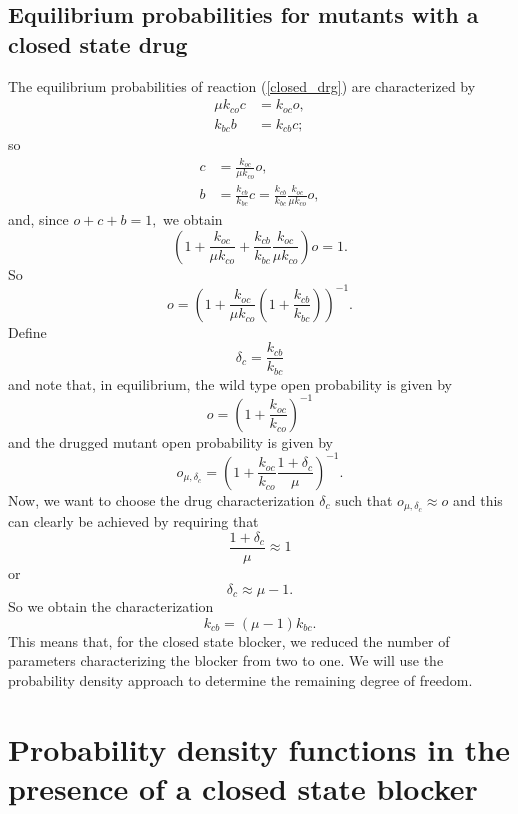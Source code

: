 \subsection{Equilibrium probabilities for mutants with a closed state drug\label{sec:eq-closed}}
The equilibrium probabilities of reaction (\ref{closed_drg}) are characterized by%
\begin{align*}
\mu k_{co}c &  =k_{oc}o,\\
k_{bc}b &  =k_{cb}c;
\end{align*}
so%
\begin{align*}
c &  =\frac{k_{oc}}{\mu k_{co}}o,\\
b &  =\frac{k_{cb}}{k_{bc}}c=\frac{k_{cb}}{k_{bc}}\frac{k_{oc}}{\mu k_{co}}o,
\end{align*}
and, since $o+c+b=1,$ we obtain%
\[
\left(  1+\frac{k_{oc}}{\mu k_{co}}+\frac{k_{cb}}{k_{bc}}\frac{k_{oc}}{\mu
k_{co}}\right)  o=1.
\]
So%
\[
o=\left(  1+\frac{k_{oc}}{\mu k_{co}}\left(  1+\frac{k_{cb}}{k_{bc}}\right)
\right)  ^{-1}.
\]
Define%
\begin{equation}
\delta_{c}=\frac{k_{cb}}{k_{bc}} \label{d_c}%
\end{equation}
and note that, in equilibrium, the wild type open probability is given by%
\[
o=\left(  1+\frac{k_{oc}}{k_{co}}\right)  ^{-1}%
\]
and the drugged mutant open probability is given by%
\[
o_{\mu,\delta_c}=\left(  1+\frac{k_{oc}}{k_{co}} \frac{1+\delta_{c}}{\mu}\right)^{-1}.
\]
Now, we want to choose the drug characterization $\delta_{c}$ such that
$o_{\mu,\delta_c}\approx o$ and this can clearly be achieved by requiring that%
\[
\frac{1+\delta_{c}}{\mu}\approx1
\]
or%
\[
\delta_{c}\approx\mu-1.
\]
So we obtain the characterization
\begin{equation}
k_{cb}=(\mu-1)k_{bc} \label{optimal_closed_charac}.
\end{equation}
This means that, for the closed state blocker, we reduced the number of parameters characterizing the blocker
from two to one. We will use the probability density approach to determine the remaining degree of freedom.


\section{Probability density functions in the presence of a closed state blocker}

